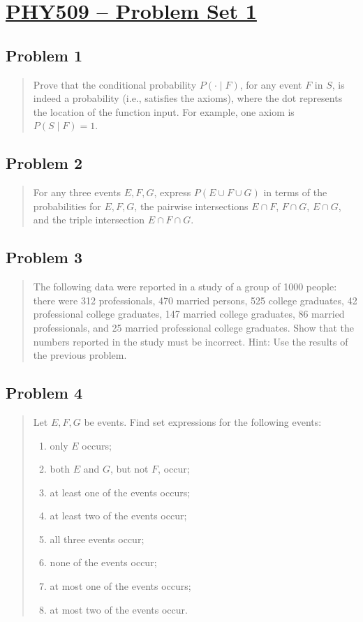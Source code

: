 \section[PHY509 – Problem Set 1]{\hyperlink{toc}{PHY509 – Problem Set 1}}

\subsection*{Problem 1}
\begin{quote}
Prove that the conditional probability $P(\cdot\mid F)$, for any event $F$ in $S$, is indeed a probability (i.e., satisfies the axioms), where the dot represents the location of the function input. For example, one axiom is $P(S\mid F)=1$.
\end{quote}

\subsection*{Problem 2}
\begin{quote}
For any three events $E,F,G$, express $P(E\cup F\cup G)$ in terms of the probabilities for $E,F,G$, the pairwise intersections $E\cap F$, $F\cap G$, $E\cap G$, and the triple intersection $E\cap F\cap G$.
\end{quote}

\subsection*{Problem 3}
\begin{quote}
The following data were reported in a study of a group of 1000 people: there were 312 professionals, 470 married persons, 525 college graduates, 42 professional college graduates, 147 married college graduates, 86 married professionals, and 25 married professional college graduates. Show that the numbers reported in the study must be incorrect. Hint: Use the results of the previous problem.
\end{quote}

\subsection*{Problem 4}
\begin{quote}
Let $E,F,G$ be events. Find set expressions for the following events:
\begin{enumerate}[label=(\alph*)]
	\item only $E$ occurs;
	\item both $E$ and $G$, but not $F$, occur;
	\item at least one of the events occurs;
	\item at least two of the events occur;
	\item all three events occur;
	\item none of the events occur;
	\item at most one of the events occurs;
	\item at most two of the events occur.
\end{enumerate}
\end{quote}

